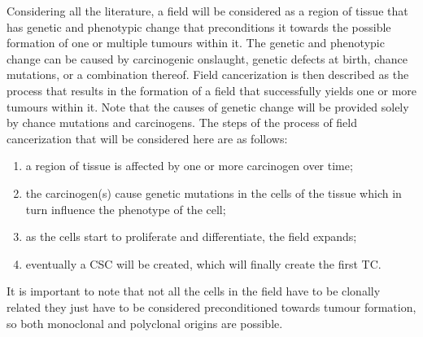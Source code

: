 \documentclass[\main/thesis.tex]{subfiles}
\begin{document}
Considering all the literature, a field will be considered as a region of tissue that has genetic and phenotypic change that preconditions it towards the possible formation of one or multiple tumours within it. The genetic and phenotypic change can be caused by carcinogenic onslaught, genetic defects at birth, chance mutations, or a combination thereof. Field cancerization is then described as the process that results in the formation of a field that successfully yields one or more tumours within it. Note that the causes of genetic change will be provided solely by chance mutations and carcinogens. The steps of the process of field cancerization that will be considered here are as follows:
\begin{enumerate}
  \item a region of tissue is affected by one or more carcinogen over time;
  \item the carcinogen(s) cause genetic mutations in the cells of the tissue which in turn influence the phenotype of the cell;
  \item as the cells start to proliferate and differentiate, the field expands;
  \item eventually a CSC will be created, which will finally create the first TC.
\end{enumerate}
It is important to note that not all the cells in the field have to be clonally related they just have to be considered preconditioned towards tumour formation, so both monoclonal and polyclonal origins are possible.
\end{document}
